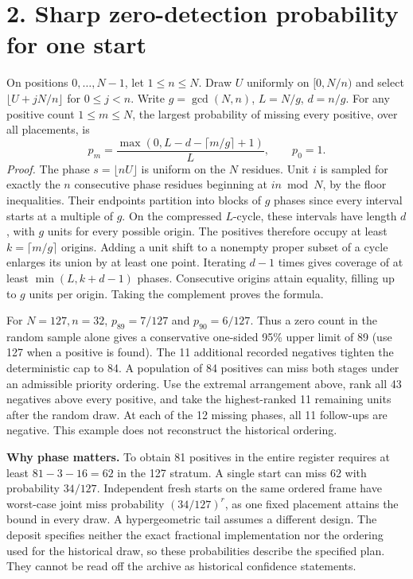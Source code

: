 \documentclass[11pt]{article}
\begin{document}
\section*{2. Sharp zero-detection probability for one start}
On positions $0,\ldots,N-1$, let $1\le n\le N$. Draw $U$ uniformly on $[0,N/n)$ and select $\lfloor U+jN/n\rfloor$ for $0\le j<n$. Write $g=\gcd(N,n)$, $L=N/g$, $d=n/g$. For any positive count $1\le m\le N$, the largest probability of missing every positive, over all placements, is
\[
 p_m=\frac{\max(0,L-d-\lceil m/g\rceil+1)}{L},\qquad p_0=1.
\]
\textit{Proof.} The phase $s=\lfloor nU\rfloor$ is uniform on the $N$ residues. Unit $i$ is sampled for exactly the $n$ consecutive phase residues beginning at $in\bmod N$, by the floor inequalities. Their endpoints partition into blocks of $g$ phases since every interval starts at a multiple of $g$. On the compressed $L$-cycle, these intervals have length $d$, with $g$ units for every possible origin. The positives therefore occupy at least $k=\lceil m/g\rceil$ origins. Adding a unit shift to a nonempty proper subset of a cycle enlarges its union by at least one point. Iterating $d-1$ times gives coverage of at least $\min(L,k+d-1)$ phases. Consecutive origins attain equality, filling up to $g$ units per origin. Taking the complement proves the formula.

For $N=127,n=32$, $p_{89}=7/127$ and $p_{90}=6/127$. Thus a zero count in the random sample alone gives a conservative one-sided 95\% upper limit of 89 (use 127 when a positive is found). The 11 additional recorded negatives tighten the deterministic cap to 84. A population of 84 positives can miss both stages under an admissible priority ordering. Use the extremal arrangement above, rank all 43 negatives above every positive, and take the highest-ranked 11 remaining units after the random draw. At each of the 12 missing phases, all 11 follow-ups are negative. This example does not reconstruct the historical ordering.

\textbf{Why phase matters.} To obtain 81 positives in the entire register requires at least $81-3-16=62$ in the 127 stratum. A single start can miss 62 with probability $34/127$. Independent fresh starts on the same ordered frame have worst-case joint miss probability $(34/127)^r$, as one fixed placement attains the bound in every draw. A hypergeometric tail assumes a different design. The deposit specifies neither the exact fractional implementation nor the ordering used for the historical draw, so these probabilities describe the specified plan. They cannot be read off the archive as historical confidence statements.
\end{document}
